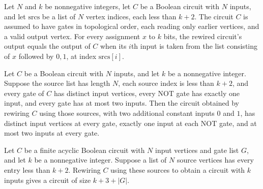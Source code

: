 \begin{theorem}
\label{BoolCircuit.DAGCircuit.rewire_eval}
\leanok
{}
Let $N$ and $k$ be nonnegative integers, let $C$ be a Boolean circuit with $N$ inputs,
and let $\text{srcs}$ be a list of $N$ vertex indices, each less than $k+2$. The circuit
$C$ is assumed to have gates in topological order, each reading only earlier vertices,
and a valid output vertex. For every assignment $x$ to $k$ bits, the rewired circuit's
output equals the output of $C$ when its $i$th input is taken from the list consisting
of $x$ followed by $0,1$, at index $\text{srcs}[i]$.
\end{theorem}

\begin{theorem}
\label{BoolCircuit.DAGCircuit.rewire_isFaninTwo}
\leanok
{}
Let $C$ be a Boolean circuit with $N$ inputs, and let $k$ be a nonnegative integer.
Suppose the source list has length $N$, each source index is less than $k+2$, and every
gate of $C$ has distinct input vertices, every NOT gate has exactly one input, and every
gate has at most two inputs. Then the circuit obtained by rewiring $C$ using those
sources, with two additional constant inputs $0$ and $1$, has distinct input vertices at
every gate, exactly one input at each NOT gate, and at most two inputs at every gate.
\end{theorem}

\begin{theorem}
\label{BoolCircuit.DAGCircuit.rewire_size}
\leanok
{}
Let $C$ be a finite acyclic Boolean circuit with $N$ input vertices and gate list $G$,
and let $k$ be a nonnegative integer. Suppose a list of $N$ source vertices has every
entry less than $k+2$. Rewiring $C$ using these sources to obtain a circuit with $k$
inputs gives a circuit of size $k+3+|G|$.
\end{theorem}

